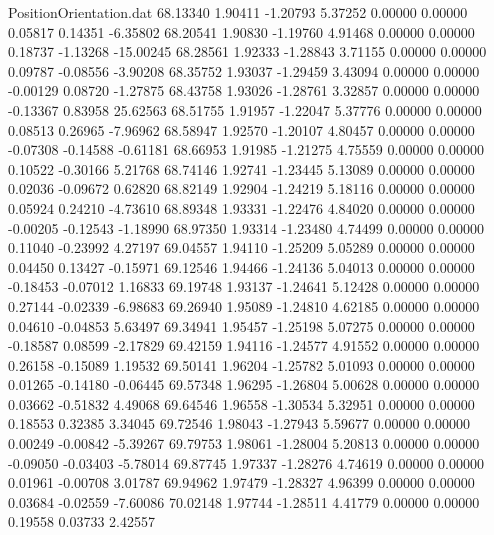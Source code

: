 \begin{filecontents}{PositionOrientation.dat}
  68.13340    1.90411   -1.20793     5.37252    0.00000    0.00000    0.05817    0.14351   -6.35802
  68.20541    1.90830   -1.19760     4.91468    0.00000    0.00000    0.18737   -1.13268  -15.00245
  68.28561    1.92333   -1.28843     3.71155    0.00000    0.00000    0.09787   -0.08556   -3.90208
  68.35752    1.93037   -1.29459     3.43094    0.00000    0.00000   -0.00129    0.08720   -1.27875
  68.43758    1.93026   -1.28761     3.32857    0.00000    0.00000   -0.13367    0.83958   25.62563
  68.51755    1.91957   -1.22047     5.37776    0.00000    0.00000    0.08513    0.26965   -7.96962
  68.58947    1.92570   -1.20107     4.80457    0.00000    0.00000   -0.07308   -0.14588   -0.61181
  68.66953    1.91985   -1.21275     4.75559    0.00000    0.00000    0.10522   -0.30166    5.21768
  68.74146    1.92741   -1.23445     5.13089    0.00000    0.00000    0.02036   -0.09672    0.62820
  68.82149    1.92904   -1.24219     5.18116    0.00000    0.00000    0.05924    0.24210   -4.73610
  68.89348    1.93331   -1.22476     4.84020    0.00000    0.00000   -0.00205   -0.12543   -1.18990
  68.97350    1.93314   -1.23480     4.74499    0.00000    0.00000    0.11040   -0.23992    4.27197
  69.04557    1.94110   -1.25209     5.05289    0.00000    0.00000    0.04450    0.13427   -0.15971
  69.12546    1.94466   -1.24136     5.04013    0.00000    0.00000   -0.18453   -0.07012    1.16833
  69.19748    1.93137   -1.24641     5.12428    0.00000    0.00000    0.27144   -0.02339   -6.98683
  69.26940    1.95089   -1.24810     4.62185    0.00000    0.00000    0.04610   -0.04853    5.63497
  69.34941    1.95457   -1.25198     5.07275    0.00000    0.00000   -0.18587    0.08599   -2.17829
  69.42159    1.94116   -1.24577     4.91552    0.00000    0.00000    0.26158   -0.15089    1.19532
  69.50141    1.96204   -1.25782     5.01093    0.00000    0.00000    0.01265   -0.14180   -0.06445
  69.57348    1.96295   -1.26804     5.00628    0.00000    0.00000    0.03662   -0.51832    4.49068
  69.64546    1.96558   -1.30534     5.32951    0.00000    0.00000    0.18553    0.32385    3.34045
  69.72546    1.98043   -1.27943     5.59677    0.00000    0.00000    0.00249   -0.00842   -5.39267
  69.79753    1.98061   -1.28004     5.20813    0.00000    0.00000   -0.09050   -0.03403   -5.78014
  69.87745    1.97337   -1.28276     4.74619    0.00000    0.00000    0.01961   -0.00708    3.01787
  69.94962    1.97479   -1.28327     4.96399    0.00000    0.00000    0.03684   -0.02559   -7.60086
  70.02148    1.97744   -1.28511     4.41779    0.00000    0.00000    0.19558    0.03733    2.42557

\end{filecontents}
